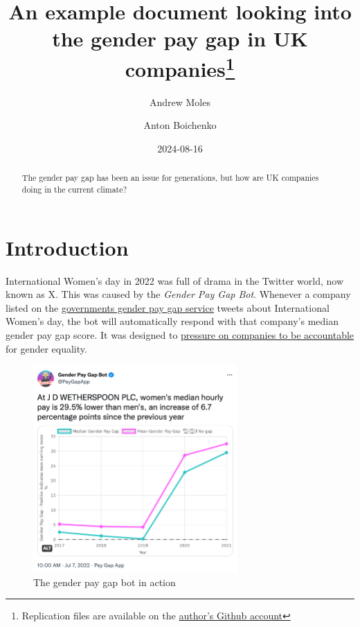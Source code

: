 \documentclass[
  11pt,
  letterpaper,
  DIV=11,
  numbers=noendperiod]{scrartcl}
\title{An example document looking into the gender pay gap in UK
companies\thanks{Replication files are available on the
\href{https://github.com/andrewmoles2/gender_pay_gap_example}{author's
Github account}}}
\author{Andrew Moles \and Anton Boichenko}
\date{2024-08-16}
\begin{document}
\maketitle
\begin{abstract}
The gender pay gap has been an issue for generations, but how are UK
companies doing in the current climate?
\end{abstract}

\newpage

\raggedright
\newpage
\setcounter{tocdepth}{4}
\tableofcontents
\listoffigures
\listoftables

\newpage

\section{Introduction}\label{introduction}

International Women's day in 2022 was full of drama in the Twitter
world, now known as X. This was caused by the \emph{Gender Pay Gap Bot}.
Whenever a company listed on the
\href{https://gender-pay-gap.service.gov.uk/}{governments gender pay gap
service} tweets about International Women's day, the bot will
automatically respond with that company's median gender pay gap score.
It was designed to
\href{https://www.independent.co.uk/tech/people-ryanair-manchester-the-new-york-times-university-b2296194.html}{pressure
on companies to be accountable} for gender equality.

\begin{figure}[H]

{\centering \includegraphics[width=0.7\textwidth,height=\textheight]{pay_gap_bot.png}

}

\caption{The gender pay gap bot in action}

\end{figure}%
\end{document}
